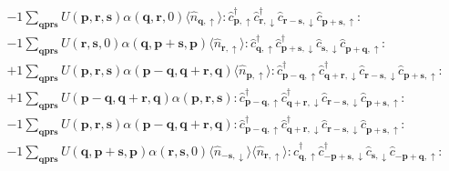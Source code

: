\begin{align*}
	&-1 \sum_{ \mathbf{q} \mathbf{p} \mathbf{r} \mathbf{s} } U( \mathbf{p}, \mathbf{r}, \mathbf{s} )  \alpha( \mathbf{q}, \mathbf{r}, 0 )   \langle \hat{n}_{ \mathbf{q}, \uparrow } \rangle :\hat{c}_{ \mathbf{p}, \uparrow }^\dagger \hat{c}_{ \mathbf{r}, \downarrow }^\dagger \hat{c}_{ \mathbf{r}-\mathbf{s}, \downarrow }^{\phantom{\dagger}}\hat{c}_{ \mathbf{p}+\mathbf{s}, \uparrow }^{\phantom{\dagger}}: \\
	&-1 \sum_{ \mathbf{q} \mathbf{p} \mathbf{r} \mathbf{s} } U( \mathbf{r}, \mathbf{s}, 0 )  \alpha( \mathbf{q}, \mathbf{p}+\mathbf{s}, \mathbf{p} )   \langle \hat{n}_{ \mathbf{r}, \uparrow } \rangle :\hat{c}_{ \mathbf{q}, \uparrow }^\dagger \hat{c}_{ \mathbf{p}+\mathbf{s}, \downarrow }^\dagger \hat{c}_{ \mathbf{s}, \downarrow }^{\phantom{\dagger}}\hat{c}_{ \mathbf{p}+\mathbf{q}, \uparrow }^{\phantom{\dagger}}: \\
	&+1 \sum_{ \mathbf{q} \mathbf{p} \mathbf{r} \mathbf{s} } U( \mathbf{p}, \mathbf{r}, \mathbf{s} )  \alpha( \mathbf{p}-\mathbf{q}, \mathbf{q}+\mathbf{r}, \mathbf{q} )   \langle \hat{n}_{ \mathbf{p}, \uparrow } \rangle :\hat{c}_{ \mathbf{p}-\mathbf{q}, \uparrow }^\dagger \hat{c}_{ \mathbf{q}+\mathbf{r}, \downarrow }^\dagger \hat{c}_{ \mathbf{r}-\mathbf{s}, \downarrow }^{\phantom{\dagger}}\hat{c}_{ \mathbf{p}+\mathbf{s}, \uparrow }^{\phantom{\dagger}}: \\
	&+1 \sum_{ \mathbf{q} \mathbf{p} \mathbf{r} \mathbf{s} } U( \mathbf{p}-\mathbf{q}, \mathbf{q}+\mathbf{r}, \mathbf{q} )  \alpha( \mathbf{p}, \mathbf{r}, \mathbf{s} )   :\hat{c}_{ \mathbf{p}-\mathbf{q}, \uparrow }^\dagger \hat{c}_{ \mathbf{q}+\mathbf{r}, \downarrow }^\dagger \hat{c}_{ \mathbf{r}-\mathbf{s}, \downarrow }^{\phantom{\dagger}}\hat{c}_{ \mathbf{p}+\mathbf{s}, \uparrow }^{\phantom{\dagger}}: \\
	&-1 \sum_{ \mathbf{q} \mathbf{p} \mathbf{r} \mathbf{s} } U( \mathbf{p}, \mathbf{r}, \mathbf{s} )  \alpha( \mathbf{p}-\mathbf{q}, \mathbf{q}+\mathbf{r}, \mathbf{q} )   :\hat{c}_{ \mathbf{p}-\mathbf{q}, \uparrow }^\dagger \hat{c}_{ \mathbf{q}+\mathbf{r}, \downarrow }^\dagger \hat{c}_{ \mathbf{r}-\mathbf{s}, \downarrow }^{\phantom{\dagger}}\hat{c}_{ \mathbf{p}+\mathbf{s}, \uparrow }^{\phantom{\dagger}}: \\
	&-1 \sum_{ \mathbf{q} \mathbf{p} \mathbf{r} \mathbf{s} } U( \mathbf{q}, \mathbf{p}+\mathbf{s}, \mathbf{p} )  \alpha( \mathbf{r}, \mathbf{s}, 0 )   \langle \hat{n}_{ -\mathbf{s}, \downarrow } \rangle \langle \hat{n}_{ \mathbf{r}, \uparrow } \rangle :\hat{c}_{ \mathbf{q}, \uparrow }^\dagger \hat{c}_{ -\mathbf{p}+\mathbf{s}, \downarrow }^\dagger \hat{c}_{ \mathbf{s}, \downarrow }^{\phantom{\dagger}}\hat{c}_{ -\mathbf{p}+\mathbf{q}, \uparrow }^{\phantom{\dagger}}: \\

\end{align*}
